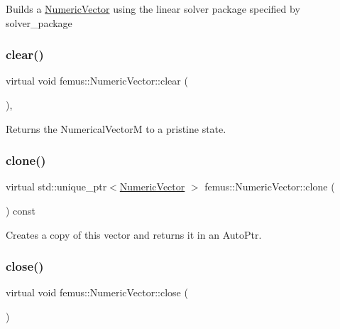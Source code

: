 Builds a {\ttfamily \mbox{\hyperlink{classfemus_1_1_numeric_vector}{Numeric\+Vector}}} using the linear solver package specified by {\ttfamily solver\+\_\+package} \mbox{\label{classfemus_1_1_numeric_vector_ab208467b03b999ece4888d64a7cc7ece}} 
\subsubsection{\texorpdfstring{clear()}{clear()}}
{\footnotesize\ttfamily virtual void femus\+::\+Numeric\+Vector\+::clear (\begin{DoxyParamCaption}{ }\end{DoxyParamCaption})\hspace{0.3cm}{\ttfamily [inline]}, {\ttfamily [virtual]}}

\begin{DoxyReturn}{Returns}
the {\ttfamily Numerical\+VectorM} to a pristine state. 
\end{DoxyReturn}
\mbox{\label{classfemus_1_1_numeric_vector_a6d7f5742be5c8b7e6ac388b4ac62af17}} 
\subsubsection{\texorpdfstring{clone()}{clone()}}
{\footnotesize\ttfamily virtual std\+::unique\+\_\+ptr$<$\mbox{\hyperlink{classfemus_1_1_numeric_vector}{Numeric\+Vector}} $>$ femus\+::\+Numeric\+Vector\+::clone (\begin{DoxyParamCaption}{ }\end{DoxyParamCaption}) const\hspace{0.3cm}{\ttfamily [pure virtual]}}

Creates a copy of this vector and returns it in an {\ttfamily Auto\+Ptr}. \mbox{\label{classfemus_1_1_numeric_vector_a80eb1dc1f53018fd7d08bcc4a511cc09}} 
\subsubsection{\texorpdfstring{close()}{close()}}
{\footnotesize\ttfamily virtual void femus\+::\+Numeric\+Vector\+::close (\begin{DoxyParamCaption}{ }\end{DoxyParamCaption})\hspace{0.3cm}{\ttfamily [pure virtual]}}

